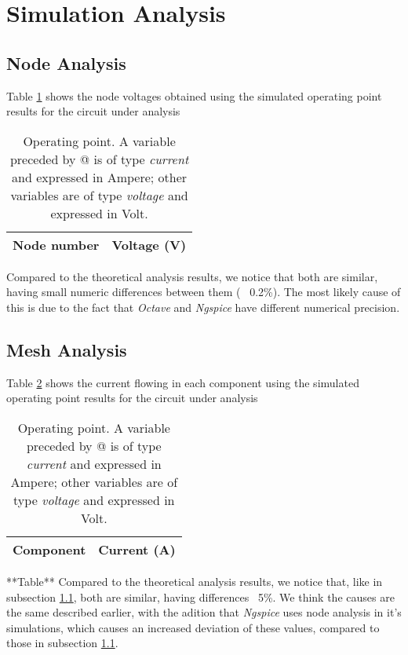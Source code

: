\section{Simulation Analysis}
\label{sec:simulation}

\subsection{Node Analysis}
\label{subsec:node_sim}

Table \ref{tab:node_sim} shows the node voltages obtained using the simulated operating point results for the circuit under analysis
\begin{table}[H]
  \centering
  \begin{tabular}{|l|r|}
    \hline    
    {\bf Node number} & {\bf Voltage (V)} \\ \hline
    
  \end{tabular}
  \caption{Operating point. A variable preceded by @ is of type {\em current}
    and expressed in Ampere; other variables are of type {\it voltage} and expressed in
    Volt.}
  \label{tab:node_sim}
\end{table}
Compared to the theoretical analysis results, we notice that both are similar, having small numeric differences between them (~ 0.2\%). The most likely cause of this is due to the fact that \textit{Octave} and \textit{Ngspice} have different numerical precision.

\subsection{Mesh Analysis}

Table \ref{tab:mesh_sim} shows the current flowing in each component using the simulated operating point results for the circuit under analysis
\begin{table}[H]
  \centering
  \begin{tabular}{|l|r|}
    \hline    
    {\bf Component} & {\bf Current (A)} \\ \hline
    
  \end{tabular}
  \caption{Operating point. A variable preceded by @ is of type {\em current}
    and expressed in Ampere; other variables are of type {\it voltage} and expressed in
    Volt.}
  \label{tab:mesh_sim}
\end{table}
**Table**
Compared to the theoretical analysis results, we notice that, like in subsection \ref{subsec:node_sim}, both are similar, having differences ~5\%. We think the causes are the same described earlier, with the adition that \textit{Ngspice} uses node analysis in it's simulations, which causes an increased deviation of these values, compared to those in subsection \ref{subsec:node_sim}.


